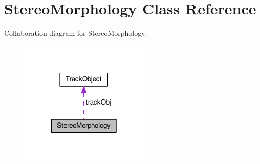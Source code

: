 \hypertarget{class_stereo_morphology}{}\section{Stereo\+Morphology Class Reference}
\label{class_stereo_morphology}


Collaboration diagram for Stereo\+Morphology\+:
\nopagebreak
\begin{figure}[H]
\begin{center}
\leavevmode
\includegraphics[width=174pt]{class_stereo_morphology__coll__graph}
\end{center}
\end{figure}

